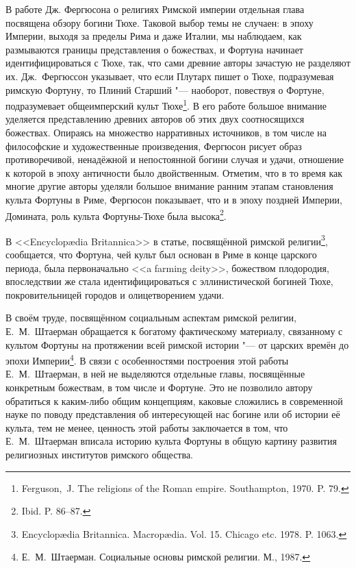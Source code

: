 В работе Дж. Фергюсона о религиях Римской империи отдельная глава посвящена обзору богини Тюхе. Таковой выбор темы не случаен: в эпоху Империи, выходя за пределы Рима и даже Италии, мы наблюдаем, как размываются границы представления о божествах, и Фортуна начинает идентифицироваться с Тюхе, так, что сами древние авторы зачастую не разделяют их. Дж.~Фергюссон указывает, что если Плутарх пишет о Тюхе, подразумевая римскую Фортуну, то Плиний Старший "--- наоборот, повествуя о Фортуне, подразумевает общеимперский культ Тюхе\footnote{Ferguson,~J. The religions of the Roman empire. Southampton, 1970. P. 79.}. В его работе большое внимание уделяется представлению древних авторов об этих двух соотносящихся божествах. Опираясь на множество нарративных источников, в том числе на философские и художественные произведения, Фергюсон рисует образ противоречивой, ненадёжной и непостоянной богини случая и удачи, отношение к которой в эпоху античности было двойственным. Отметим, что в то время как многие другие авторы уделяли большое внимание ранним этапам становления культа Фортуны в Риме, Фергюсон показывает, что и в эпоху поздней Империи, Домината, роль культа Фортуны-Тюхе была высока\footnote{Ibid. P. 86--87.}. 

В <<Encyclop\ae{}dia Britannica>> в статье, посвящённой римской религии\footnote{Encyclop\ae{}dia Britannica. Macrop\ae{}dia. Vol. 15. Chicago etc. 1978. P. 1063.}, сообщается, что Фортуна, чей культ был основан в Риме в конце царского периода, была первоначально <<a farming deity>>, божеством плодородия, впоследствии же стала идентифицироваться с эллинистической богиней Тюхе, покровительницей городов и олицетворением удачи.

В своём труде, посвящённом социальным аспектам римской религии, Е.~М.~Штаерман обращается к богатому фактическому материалу, связанному с культом Фортуны на протяжении всей римской истории "--- от царских времён до эпохи Империи\footnote{Е.~М.~Штаерман. Социальные основы римской религии. М., 1987.}. В связи с особенностями построения этой работы Е.~М.~Штаерман, в ней не выделяются отдельные главы, посвящённые конкретным божествам, в том числе и Фортуне. Это не позволило автору обратиться к каким-либо общим концепциям, каковые сложились в современной науке по поводу представления об интересующей нас богине или об истории её культа, тем не менее, ценность этой работы заключается в том, что Е.~М.~Штаерман вписала историю культа Фортуны в общую картину развития религиозных институтов римского общества.

